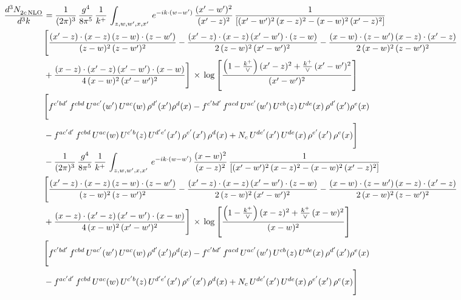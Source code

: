 \documentclass[9pt]{article}
\numberwithin{equation}{section}
\begin{document}
\begin{align}
    \frac{d^{3}N_{2c\,\rm NLO}^{\rm}}{d^{3}k}  & =  \frac{1}{(2\pi)^{3}}\, \frac{g^{4}}{8\pi^{5}}\,\frac{1}{k^{+}}\,\int_{z,w,w^{\prime},x,x'}\, e^{-ik\cdot (w-w')}\,\frac{(x'-w')^{2}}{(x'-z)^{2}}\, \frac{1}{\left[(x'-w')^{2}\, (x-z)^{2} - (x-w)^{2}\, (x'-z)^{2}\right]} \notag \\ & \Bigg[\frac{(x'-z)\cdot (x-z)\, (z-w)\cdot (z-w')}{(z-w)^{2}\, (z-w')^{2}}-\frac{(x'-z)\cdot (x-z)\, (x'-w')\cdot (z-w)}{2\, (z-w)^{2}\, (x'-w')^{2}} -\frac{(x-w)\cdot (z-w')\, (x-z)\cdot (x'-z)}{2\, (x-w)^{2}\, (z-w')^{2}}\notag \\ & +\frac{(x-z)\cdot (x'-z)\, (x'-w')\cdot (x-w)}{4\, (x-w)^{2}\, (x'-w')^{2}}\Bigg]\,\times\, \log{\left[\frac{\left(1-\frac{k^{+}}{\vee}\right)(x'-z)^{2}+\frac{k^{+}}{\vee}\,(x'-w')^{2}}{(x'-w')^{2}}\right]} \notag \\ &  \Bigg[f^{c'bd'}\,f^{cbd}\, U^{ac'}(w')\,U^{ac}(w)\,\rho^{d'}(x')\rho^{d}(x)- f^{c'bd'}\,f^{acd}\,U^{ac'}(w')\,U^{cb}(z)\,U^{de}(x)\,\rho^{d'}(x')\rho^{e}(x) \notag \\ & -f^{ac'd'}\,f^{cbd}\,U^{ac}(w)\,U^{c'b}(z)\,U^{d'e'}(x')\,\rho^{e'}(x')\,\rho^{d}(x) +N_{c}\,U^{de'}(x')\,U^{de}(x)\,\rho^{e'}(x')\,\rho^{e}(x)\Bigg] \notag \\
& -\frac{1}{(2\pi)^{3}}\, \frac{g^{4}}{8\pi^{5}}\,\frac{1}{k^{+}}\,\int_{z,w,w^{\prime},x,x'}\, e^{-ik\cdot (w-w')}\,\frac{(x-w)^{2}}{(x-z)^{2}}\, \frac{1}{\left[(x'-w')^{2}\, (x-z)^{2} - (x-w)^{2}\, (x'-z)^{2}\right]} \notag \\ & \Bigg[\frac{(x'-z)\cdot (x-z)\, (z-w)\cdot (z-w')}{(z-w)^{2}\, (z-w')^{2}}-\frac{(x'-z)\cdot (x-z)\, (x'-w')\cdot (z-w)}{2\, (z-w)^{2}\, (x'-w')^{2}} -\frac{(x-w)\cdot (z-w')\, (x-z)\cdot (x'-z)}{2\, (x-w)^{2}\, (z-w')^{2}}\notag \\ & +\frac{(x-z)\cdot (x'-z)\, (x'-w')\cdot (x-w)}{4\, (x-w)^{2}\, (x'-w')^{2}}\Bigg]\,\times\, \log{\left[\frac{\left(1-\frac{k^{+}}{\vee}\right)(x-z)^{2}+\frac{k^{+}}{\vee}\,(x-w)^{2}}{(x-w)^{2}}\right]} \notag \\ &  \Bigg[f^{c'bd'}\,f^{cbd}\, U^{ac'}(w')\,U^{ac}(w)\,\rho^{d'}(x')\rho^{d}(x)- f^{c'bd'}\,f^{acd}\,U^{ac'}(w')\,U^{cb}(z)\,U^{de}(x)\,\rho^{d'}(x')\rho^{e}(x) \notag \\ & -f^{ac'd'}\,f^{cbd}\,U^{ac}(w)\,U^{c'b}(z)\,U^{d'e'}(x')\,\rho^{e'}(x')\,\rho^{d}(x) +N_{c}\,U^{de'}(x')\,U^{de}(x)\,\rho^{e'}(x')\,\rho^{e}(x)\Bigg]
\end{align}
\end{document}
